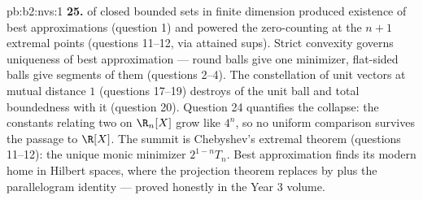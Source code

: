 \begin{solution}{pb:b2:nvs:1}
\textbf{25.}  of closed bounded sets in finite
dimension produced existence of best approximations (question
1) and powered the zero-counting at the $n + 1$ extremal points
(questions 11--12, via attained sups). Strict convexity governs
uniqueness of best approximation --- round balls give one
minimizer, flat-sided balls give segments of them (questions
2--4). The constellation of unit vectors at mutual distance
$1$ (questions 17--19) destroys  of the unit ball
and total boundedness with it (question 20). Question 24
quantifies the collapse: the constants relating two  on
$\R_n[X]$ grow like $4^n$, so no uniform comparison survives
the passage to $\R[X]$. The summit is Chebyshev's extremal
theorem (questions 11--12): the unique monic minimizer
$2^{1-n}T_n$. Best approximation finds its modern home in
Hilbert spaces, where the projection theorem replaces
 by  plus the parallelogram identity ---
proved honestly in the Year 3 volume.
\end{solution}
